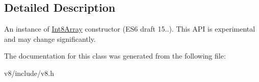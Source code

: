\subsection{Detailed Description}
An instance of \hyperlink{classv8_1_1Int8Array}{Int8\-Array} constructor (E\-S6 draft 15..). This A\-P\-I is experimental and may change significantly. 

The documentation for this class was generated from the following file\-:\begin{DoxyCompactItemize}
\item 
v8/include/v8.\-h\end{DoxyCompactItemize}
